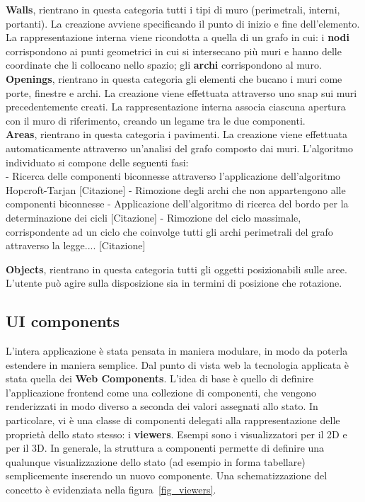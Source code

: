 \textbf{Walls}, rientrano in questa categoria tutti i tipi di muro (perimetrali, interni, portanti). La creazione avviene specificando il punto di inizio e fine dell’elemento. La rappresentazione interna viene ricondotta a quella di un grafo in cui: i \textbf{nodi} corrispondono ai punti geometrici in cui si intersecano più muri e hanno delle coordinate che li collocano nello spazio; gli \textbf{archi} corrispondono al muro.\\
\textbf{Openings}, rientrano in questa categoria gli elementi che bucano i muri come porte, finestre e archi. La creazione viene effettuata attraverso uno snap sui muri precedentemente creati. La rappresentazione interna associa ciascuna apertura con il muro di riferimento, creando un legame tra le due componenti.\\
\textbf{Areas}, rientrano in questa categoria i pavimenti. La creazione viene effettuata automaticamente attraverso un’analisi del grafo composto dai muri. L’algoritmo individuato si compone delle seguenti fasi:\\
    - Ricerca delle componenti biconnesse attraverso l'applicazione dell'algoritmo Hopcroft-Tarjan [Citazione]
    - Rimozione degli archi che non appartengono alle componenti biconnesse
    - Applicazione dell'algoritmo di ricerca del bordo per la determinazione dei cicli [Citazione]
    - Rimozione del ciclo massimale, corrispondente ad un ciclo che coinvolge tutti gli archi perimetrali del grafo attraverso la legge.... [Citazione]

\textbf{Objects}, rientrano in questa categoria tutti gli oggetti posizionabili sulle aree. L’utente può agire sulla disposizione sia in termini di posizione che rotazione.\\

\subsection{UI components}

L'intera applicazione \`e stata pensata in maniera modulare, in modo da poterla estendere in maniera semplice. Dal punto di vista web la tecnologia applicata è stata quella dei \textbf{Web Components}. L'idea di base è quello di definire l'applicazione frontend come una collezione di componenti, che vengono renderizzati in modo diverso a seconda dei valori assegnati allo stato. In particolare, vi è una classe di componenti delegati alla rappresentazione delle propriet\`a dello stato stesso: i \textbf{viewers}. Esempi sono i visualizzatori per il 2D e per il 3D. In generale, la struttura a componenti permette di definire una qualunque visualizzazione dello stato (ad esempio in forma tabellare) semplicemente inserendo un nuovo componente. Una schematizzazione del concetto è evidenziata nella figura~\ref{fig_viewers}.\\

